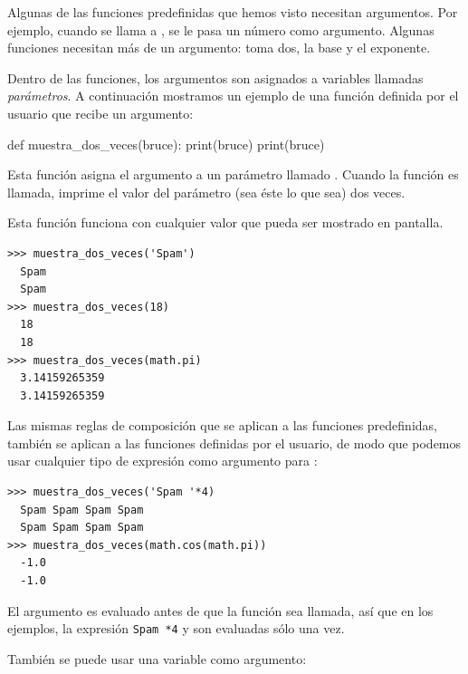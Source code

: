   

Algunas de las funciones predefinidas que hemos visto necesitan argumentos.
Por ejemplo, cuando se llama a , se le pasa un número
como argumento. Algunas funciones necesitan más de un argumento:
 toma dos, la base y el exponente.

Dentro de las funciones, los argumentos son asignados a variables
llamadas \emph{parámetros}. A continuación mostramos un ejemplo de una
función definida por el usuario que recibe un argumento:


\begin{python}[frame=single]
def muestra_dos_veces(bruce):
    print(bruce)
    print(bruce)
\end{python}

Esta función asigna el argumento a un parámetro llamado .
Cuando la función es llamada, imprime el valor del parámetro (sea éste
lo que sea) dos veces.

Esta función funciona con cualquier valor que pueda ser mostrado en
pantalla.

\begin{Verbatim}[frame=single]
>>> muestra_dos_veces('Spam')
  Spam
  Spam
>>> muestra_dos_veces(18)
  18
  18
>>> muestra_dos_veces(math.pi)
  3.14159265359
  3.14159265359
\end{Verbatim}

Las mismas reglas de composición que se aplican a las funciones
predefinidas, también se aplican a las funciones definidas por el usuario,
de modo que podemos usar cualquier tipo de expresión como argumento para
:


\begin{Verbatim}[frame=single]
>>> muestra_dos_veces('Spam '*4)
  Spam Spam Spam Spam
  Spam Spam Spam Spam
>>> muestra_dos_veces(math.cos(math.pi))
  -1.0
  -1.0
\end{Verbatim}

El argumento es evaluado antes de que la función sea llamada, así que en
los ejemplos, la expresión \texttt{Spam\ *4} y
 son evaluadas sólo una vez.


También se puede usar una variable como argumento:

